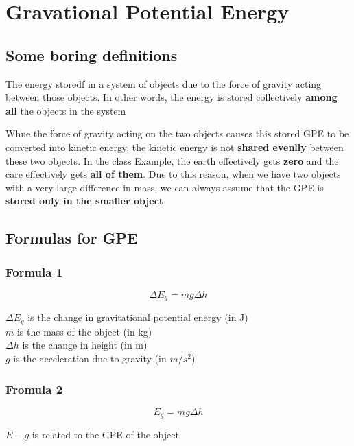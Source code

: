 \newpage
\section{Gravational Potential Energy}
\subsection{Some boring definitions}
\begin{definition}
    The energy storedf in a system of objects due to the force of gravity acting between those objects. In other words, the energy is stored collectively \textbf{among all } the objects in the system
\end{definition}

Whne the force of gravity acting on the two objects causes this stored GPE to be converted into kinetic energy, the kinetic energy is not \textbf{shared evenlly} between these two objects. 
In the class Example, the earth effectively gets \textbf{zero} and the care effectively gets \textbf{all of them}. Due to this reason, when we have two objects with a very large difference in mass, we can 
always assume that the GPE is \textbf{stored only in the smaller object}

\subsection{Formulas for GPE}
\subsubsection*{Formula 1}
\begin{equation}
    \Delta E_g = mg\Delta h
\end{equation}

\begin{center}
    $\Delta E_g$ is the change in gravitational potential energy (in J)\\
    $m$ is the mass of the object (in kg)\\
    $\Delta h$ is the change in height (in m)\\
    $g$ is the acceleration due to gravity (in $m/s^2$)
\end{center}

\subsubsection*{Fromula 2}
\begin{equation}
    E_g = mg\Delta h
\end{equation}
\begin{center}
    $E-g$ is related to the GPE of the object
\end{center}

